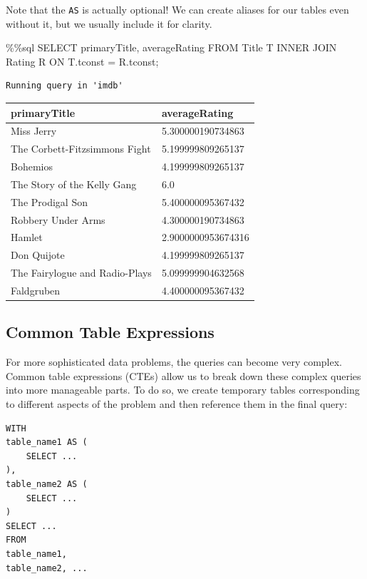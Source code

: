 \documentclass[
  letterpaper,
  DIV=11,
  numbers=noendperiod]{scrreprt}
\newenvironment{Shaded}{\begin{snugshade}}{\end{snugshade}}
\newcommand{\NormalTok}[1]{\textcolor[rgb]{0.00,0.23,0.31}{#1}}
\newcommand{\OperatorTok}[1]{\textcolor[rgb]{0.37,0.37,0.37}{#1}}
\begin{document}
Note that the \texttt{AS} is actually optional! We can create aliases
for our tables even without it, but we usually include it for clarity.

\begin{Shaded}
\begin{Highlighting}[]
\OperatorTok{\%\%}\NormalTok{sql}
\NormalTok{SELECT primaryTitle, averageRating}
\NormalTok{FROM Title T INNER JOIN Rating R}
\NormalTok{ON T.tconst }\OperatorTok{=}\NormalTok{ R.tconst}\OperatorTok{;}
\end{Highlighting}
\end{Shaded}

\begin{verbatim}
Running query in 'imdb'
\end{verbatim}

\begin{longtable}[]{@{}ll@{}}
\toprule\noalign{}
primaryTitle & averageRating \\
\midrule\noalign{}
\endhead
\bottomrule\noalign{}
\endlastfoot
Miss Jerry & 5.300000190734863 \\
The Corbett-Fitzsimmons Fight & 5.199999809265137 \\
Bohemios & 4.199999809265137 \\
The Story of the Kelly Gang & 6.0 \\
The Prodigal Son & 5.400000095367432 \\
Robbery Under Arms & 4.300000190734863 \\
Hamlet & 2.9000000953674316 \\
Don Quijote & 4.199999809265137 \\
The Fairylogue and Radio-Plays & 5.099999904632568 \\
Faldgruben & 4.400000095367432 \\
\end{longtable}

\subsection{Common Table Expressions}\label{common-table-expressions}

For more sophisticated data problems, the queries can become very
complex. Common table expressions (CTEs) allow us to break down these
complex queries into more manageable parts. To do so, we create
temporary tables corresponding to different aspects of the problem and
then reference them in the final query:

\begin{verbatim}
WITH 
table_name1 AS ( 
    SELECT ...
),
table_name2 AS ( 
    SELECT ...
)
SELECT ... 
FROM 
table_name1, 
table_name2, ...
\end{verbatim}
\end{document}
